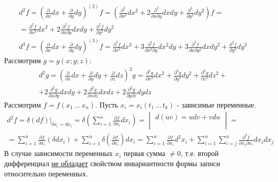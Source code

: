 \documentclass[12pt]{article}
\begin{document}
    \begin{gather*}
            d^2 f=\left(\frac{\partial}{\partial x} d x+\frac{\partial}{\partial y} d y\right)^{(2)} f=\left(\frac{\partial^2}{\partial x^2} d x^2+2 \frac{\partial^2}{\partial x \partial y} d x d y+\frac{\partial^2}{\partial y^2} d y^2\right) f= \\
            = \frac{\partial^2 f}{\partial x^2} d x^2+2 \frac{\partial^2 f}{\partial x \partial y} d x d y+\frac{\partial^2 f}{\partial y^2} d y^2 \\
            d^3 f=\left(\frac{\partial}{\partial x} d x+\frac{\partial}{\partial y} d y\right)^{(3)} f=\frac{\partial^3 f}{\partial x^3} d x^3+3 \frac{\partial^3 f}{\partial x^2 \partial y} d x^2 d y+3 \frac{\partial^3 f}{\partial x \partial y^2} d x d y^2+\frac{\partial^3 f}{\partial y^3} d y^3
    \end{gather*}
    Рассмотрим $g = g(x; y; z)$:
    \begin{gather*}
        d^2 g=\left(\frac{\partial}{\partial x} d x+\frac{\partial}{\partial y} d y+\frac{\partial}{\partial z} d z\right)^2 g=\frac{\partial^2 g}{\partial x^2} d x^2+\frac{\partial^2 g}{\partial y^2} d y^2+\frac{\partial^2 g}{\partial z^2} d z^2+ \\
        +2 \frac{\partial^2 g}{\partial x \partial y} d x d y+2 \frac{\partial^2 g}{\partial x \partial z} d x d z+2 \frac{\partial^2 g}{\partial y \partial z} d y d z
    \end{gather*}
    Рассмотрим $f = f(x_1\, \dots\, x_n)$. Пусть $x_i = x_i(t_1\, \dots\, t_k)$ - зависимые переменные.
    \begin{gather*}
        d^2 f=\delta(d f) \Big|_{\delta x_i=d x_i}=\delta\left(\sum_{i=1}^n \frac{\partial f}{\partial x_i} d x_i\right)=\begin{vmatrix}d(u v)=u d v+v d u\\\\\end{vmatrix} \boxed{=} \\
        \boxed{=} \sum_{i=1}^n \frac{\partial f}{\partial x_i}\left(\delta d x_i\right)+\sum_{i=1}^n \delta\left(\frac{\partial f}{\partial x_i}\right) d x_i=\sum_{i=1}^n \frac{\partial f}{\partial x_i} d^2 x_i+\sum_{i=1}^n \sum_{i=j}^n \frac{\partial^2 f}{\partial x_j \partial x_i} d x_i d x_j
    \end{gather*}
    В случае зависимости переменных $x_i$ первая сумма $\ne 0$, т.е. второй дифференциал \underline{не обладает} свойством инвариантности формы записи относительно переменных.
\end{document}

